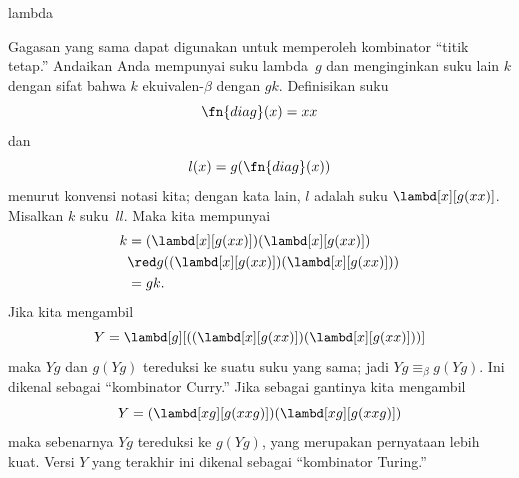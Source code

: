 \documentclass[../../../include/open-logic-section]{subfiles}
\begin{document}
\begin{tagblock}{lambda}
\begin{digress}
Gagasan yang sama dapat digunakan untuk memperoleh kombinator ``titik
tetap.'' Andaikan Anda mempunyai suku lambda~$g$ dan menginginkan suku lain
$k$ dengan sifat bahwa $k$ ekuivalen-$\beta$ dengan $gk$. Definisikan suku
\[
\fn{diag}(x) = xx
\]
dan
\[
l(x) = g(\fn{diag}(x))
\]
menurut konvensi notasi kita; dengan kata lain, $l$ adalah suku
$\lambd[x][g(xx)]$. Misalkan $k$ suku~$ll$. Maka kita mempunyai
\begin{align*}
k & = (\lambd[x][g(xx)])(\lambd[x][g(xx)]) \\
& \red  g((\lambd[x][g(xx)])(\lambd[x][g(xx)])) \\
& = gk.
\end{align*}
Jika kita mengambil
\[
Y = \lambd[g][((\lambd[x][g(xx)])(\lambd[x][g(xx)]))]
\]
maka $Yg$ dan $g(Yg)$ tereduksi ke suatu suku yang sama; jadi
$Yg \equiv_\beta g(Yg)$. Ini dikenal sebagai ``kombinator Curry.'' Jika
sebagai gantinya kita mengambil
\[
Y = (\lambd[xg][g(xxg)])(\lambd[xg][g(xxg)])
\]
maka sebenarnya $Yg$ tereduksi ke $g(Yg)$, yang merupakan pernyataan lebih
kuat. Versi $Y$ yang terakhir ini dikenal sebagai ``kombinator Turing.''
\end{digress}
\end{tagblock}
\end{document}
